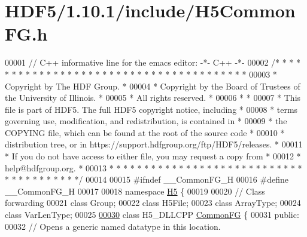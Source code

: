 \hypertarget{_h_d_f5_21_810_81_2include_2_h5_common_f_g_8h_source}{}\section{H\+D\+F5/1.10.1/include/\+H5\+Common\+FG.h}
\label{_h_d_f5_21_810_81_2include_2_h5_common_f_g_8h_source}

\begin{DoxyCode}
00001 \textcolor{comment}{// C++ informative line for the emacs editor: -*- C++ -*-}
00002 \textcolor{comment}{/* * * * * * * * * * * * * * * * * * * * * * * * * * * * * * * * * * * * * * *}
00003 \textcolor{comment}{ * Copyright by The HDF Group.                                               *}
00004 \textcolor{comment}{ * Copyright by the Board of Trustees of the University of Illinois.         *}
00005 \textcolor{comment}{ * All rights reserved.                                                      *}
00006 \textcolor{comment}{ *                                                                           *}
00007 \textcolor{comment}{ * This file is part of HDF5.  The full HDF5 copyright notice, including     *}
00008 \textcolor{comment}{ * terms governing use, modification, and redistribution, is contained in    *}
00009 \textcolor{comment}{ * the COPYING file, which can be found at the root of the source code       *}
00010 \textcolor{comment}{ * distribution tree, or in https://support.hdfgroup.org/ftp/HDF5/releases.  *}
00011 \textcolor{comment}{ * If you do not have access to either file, you may request a copy from     *}
00012 \textcolor{comment}{ * help@hdfgroup.org.                                                        *}
00013 \textcolor{comment}{ * * * * * * * * * * * * * * * * * * * * * * * * * * * * * * * * * * * * * * */}
00014 
00015 \textcolor{preprocessor}{#ifndef \_\_CommonFG\_H}
00016 \textcolor{preprocessor}{#define \_\_CommonFG\_H}
00017 
00018 \textcolor{keyword}{namespace }\hyperlink{namespace_h5}{H5} \{
00019 
00020 \textcolor{comment}{// Class forwarding}
00021 \textcolor{keyword}{class }Group;
00022 \textcolor{keyword}{class }H5File;
00023 \textcolor{keyword}{class }ArrayType;
00024 \textcolor{keyword}{class }VarLenType;
00025 
\hyperlink{class_h5_1_1_common_f_g}{00030} \textcolor{keyword}{class }H5\_DLLCPP \hyperlink{class_h5_1_1_common_f_g}{CommonFG} \{
00031    \textcolor{keyword}{public}:
00032         \textcolor{comment}{// Opens a generic named datatype in this location.}

\end{DoxyCode}
